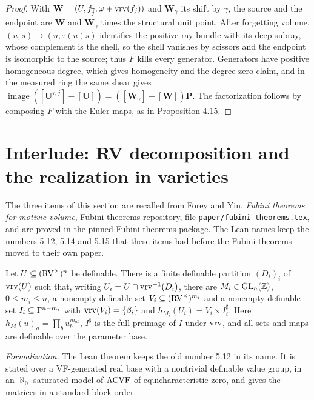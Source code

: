 \begin{proof}
\leanok
With $\mathbf{W} = (U, f_{\widetilde{j}}, \omega + \operatorname{vrv}(f_j))$ and $\mathbf{W}_\gamma$ its shift by $\gamma$, the source and the endpoint are $\mathbf{W}$ and $\mathbf{W}_\gamma$ times the structural unit point. After forgetting volume, $(u, s) \mapsto (u, \tau(u) s)$ identifies the positive-ray bundle with its deep subray, whose complement is the shell, so the shell vanishes by scissors and the endpoint is isomorphic to the source; thus $F$ kills every generator. Generators have positive homogeneous degree, which gives homogeneity and the degree-zero claim, and in the measured ring the same shear gives $\operatorname{image}([\mathbf{U}^{\tau, j}] - [\mathbf{U}]) = ([\mathbf{W}_\gamma] - [\mathbf{W}]) \mathbf{P}$. The factorization follows by composing $F$ with the Euler maps, as in Proposition 4.15.
\end{proof}

\section{Interlude: RV decomposition and the realization in varieties}
\label{section-5}
The three items of this section are recalled from Forey and Yin, \emph{Fubini theorems for motivic volume}, \href{https://github.com/daviddhilbert/Fubini-theorems}{Fubini-theorems repository}, file \texttt{paper/fubini-theorems.tex}, and are proved in the pinned Fubini-theorems package. The Lean names keep the numbers 5.12, 5.14 and 5.15 that these items had before the Fubini theorems moved to their own paper.

\setcounter{theorem}{0}
\begin{imported}
\label{coh-decom}
\leanok
Let $U \subseteq (\mathrm{RV}^\times)^n$ be definable. There is a finite definable partition $(D_i)_i$ of $\operatorname{vrv}(U)$ such that, writing $U_i = U \cap \operatorname{vrv}^{-1}(D_i)$, there are $M_i \in \operatorname{GL}_n(\mathbb{Z})$, $0 \le m_i \le n$, a nonempty definable set $V_i \subseteq (\mathrm{RV}^\times)^{m_i}$ and a nonempty definable set $I_i \subseteq \Gamma^{n-m_i}$ with $\operatorname{vrv}(V_i) = \{\beta_i\}$ and $h_{M_i}(U_i) = V_i \times I_i^\sharp$. Here $h_M(u)_a = \prod_b u_b^{m_{ab}}$, $I^\sharp$ is the full preimage of $I$ under $\operatorname{vrv}$, and all sets and maps are definable over the parameter base.

\emph{Formalization.} The Lean theorem keeps the old number 5.12 in its name. It is stated over a VF-generated real base with a nontrivial definable value group, in an $\aleph_0$-saturated model of $\mathrm{ACVF}$ of equicharacteristic zero, and gives the matrices in a standard block order.
\end{imported}

